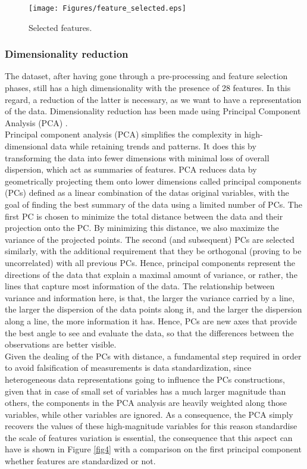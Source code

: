 \documentclass[runningheads]{llncs}
\begin{document}
\begin{figure}[h]
    \begin{adjustwidth}{-0.5in}{0in}
        \texttt{[image: Figures/feature\_selected.eps]}
        \caption{Selected features.}
        \label{fig3}
    \end{adjustwidth}
\end{figure}

\subsubsection{Dimensionality reduction}
The dataset, after having gone through a pre-processing and feature selection phases, still has a high dimensionality with the presence of 28 features. In this regard, a reduction of the latter is necessary, as we want to have a representation of the data. Dimensionality reduction has been made using Principal Component Analysis (PCA) \cite{paper_pca}.\\
Principal component analysis (PCA) simplifies the complexity in high-dimensional data while retaining trends and patterns. It does this by transforming the data into fewer dimensions with minimal loss of overall dispersion, which act as summaries of features. PCA reduces data by geometrically projecting them onto lower dimensions called principal components (PCs) defined as a linear combination of the data\textquotesingle s original variables, with the goal of finding the best summary of the data using a limited number of PCs. The first PC is chosen to minimize the total distance between the data and their projection onto the PC. By minimizing this distance, we also maximize the variance of the projected points. The second (and subsequent) PCs are selected similarly, with the additional requirement that they be orthogonal (proving to be uncorrelated) with all previous PCs. Hence, principal components represent the directions of the data that explain a maximal amount of variance, or rather, the lines that capture most information of the data. The relationship between variance and information here, is that, the larger the variance carried by a line, the larger the dispersion of the data points along it, and the larger the dispersion along a line, the more information it has. Hence, PCs are new axes that provide the best angle to see and evaluate the data, so that the differences between the observations are better visible.\\
Given the dealing of the PCs with distance, a fundamental step required in order to avoid falsification of measurements is data standardization, since heterogeneous data representations going to influence the PCs constructions, given that in case of small set of variables has a much larger magnitude than others, the components in the PCA analysis are heavily weighted along those variables, while other variables are ignored. As a consequence, the PCA simply recovers the values of these high-magnitude variables for this reason standardise the scale of features variation is essential, the consequence that this aspect can have is shown in Figure \ref{fig4} with a comparison on the first principal component whether features are standardized or not.
\end{document}
